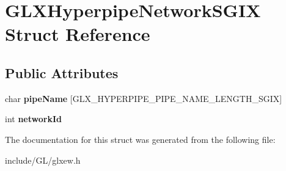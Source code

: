\hypertarget{structGLXHyperpipeNetworkSGIX}{}\section{G\+L\+X\+Hyperpipe\+Network\+S\+G\+IX Struct Reference}
\label{structGLXHyperpipeNetworkSGIX}
\subsection*{Public Attributes}
\begin{DoxyCompactItemize}
\item 
\mbox{\label{structGLXHyperpipeNetworkSGIX_a6338b9717fa895aec16b932f2ef693ed}} 
char {\bfseries pipe\+Name} \mbox{[}G\+L\+X\+\_\+\+H\+Y\+P\+E\+R\+P\+I\+P\+E\+\_\+\+P\+I\+P\+E\+\_\+\+N\+A\+M\+E\+\_\+\+L\+E\+N\+G\+T\+H\+\_\+\+S\+G\+IX\mbox{]}
\item 
\mbox{\label{structGLXHyperpipeNetworkSGIX_a81393053988b32fadb0b21615024add1}} 
int {\bfseries network\+Id}
\end{DoxyCompactItemize}


The documentation for this struct was generated from the following file\+:\begin{DoxyCompactItemize}
\item 
include/\+G\+L/glxew.\+h\end{DoxyCompactItemize}
